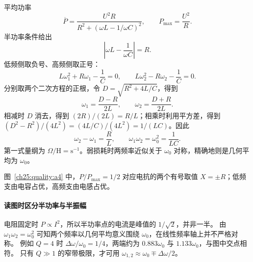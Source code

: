 \begin{xesolution}
\begin{center}\begin{minipage}{.96\linewidth}\centering
{}
\end{minipage}\end{center}

平均功率
\[
 \overline P=\frac{U^2R}{R^2+(\omega L-1/\omega C)^2},
 \qquad P_{\max}=\frac{U^2}{R}.
\]
半功率条件给出
\[
 \left|\omega L-\frac1{\omega C}\right|=R.
\]
低频侧取负号、高频侧取正号：
\[
 L\omega_1^2+R\omega_1-\frac1C=0,
 \qquad
 L\omega_2^2-R\omega_2-\frac1C=0.
\]
分别取两个二次方程的正根，令 $D=\sqrt{R^2+4L/C}$，得到
\[
 \omega_1=\frac{D-R}{2L},\qquad \omega_2=\frac{D+R}{2L}.
\]
相减时 $D$ 消去，得到 $(2R)/(2L)=R/L$；相乘时利用平方差，得到
$(D^2-R^2)/(4L^2)=(4L/C)/(4L^2)=1/(LC)$。因此
\[
 \boxed{\omega_2-\omega_1=\frac RL},
 \qquad \boxed{\omega_1\omega_2=\omega_0^2=\frac1{LC}}.
\]
第一式量纲为 $\Omega/\mathrm H=\mathrm{s^{-1}}$。弱损耗时两频率近似关于 $\omega_0$ 对称，精确地则是几何平均为 $\omega_0$。

图~\ref{ch25:quality:a4} 中，$P/P_{\max}=1/2$ 对应电抗的两个有号取值 $X=\pm R$；低频支由电容占优，高频支由电感占优。
\end{xesolution}



\paragraph{读图时区分半功率与半振幅}
电阻固定时 $P\propto I^2$，所以半功率点的电流是峰值的 $1/\sqrt2$，并非一半。
由 $\omega_1\omega_2=\omega_0^2$ 可知两个频率以几何平均意义围绕 $\omega_0$，在线性频率轴上并不严格对称。
例如 $Q=4$ 时 $\Delta\omega/\omega_0=1/4$，两端约为 $0.883\omega_0$ 与 $1.133\omega_0$，与图中交点相符。
只有 $Q\gg1$ 的窄带极限，才可用 $\omega_{1,2}\approx\omega_0\mp\Delta\omega/2$。


